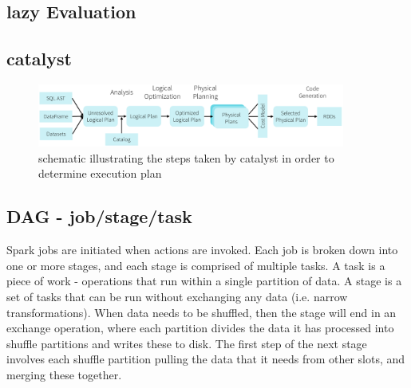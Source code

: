 \documentclass{article}
\begin{document}




\subsection{lazy Evaluation}
\subsection{catalyst}
\begin{figure}[hbpt]
    \includegraphics[width=0.9\textwidth]{catalyst-diagram.png}
    \caption{schematic illustrating the steps taken by catalyst in order to determine execution plan}
    \label{fig_catalyst_diagram}
\end{figure}

\subsection{DAG - job/stage/task}
Spark jobs are initiated when actions are invoked. Each job is broken down into one or more stages, and each stage is comprised of multiple tasks.
A task is a piece of work - operations that run within a single partition of data. A stage is a set of tasks that can be run without exchanging any data (i.e. narrow transformations). When data needs to be shuffled, then the stage will end in an exchange operation, where each partition divides the data it has processed into shuffle partitions and writes these to disk. The first step of the next stage involves each shuffle partition pulling the data that it needs from other slots, and merging these together.
\end{document}

